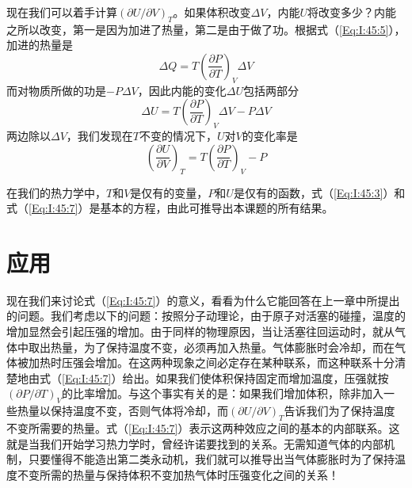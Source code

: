 现在我们可以着手计算$(\partial U /\partial V)_T$。如果体积改变$\Delta V$，内能$U$将改变多少？内能之所以改变，第一是因为加进了热量，第二是由于做了功。根据式（\ref{Eq:I:45:5}），加进的热量是
\begin{equation*}
    \Delta Q = T\left(\frac{\partial P}{\partial T}\right)_V \Delta V
\end{equation*}
而对物质所做的功是$-P \Delta V$，因此内能的变化$\Delta U$包括两部分
\begin{equation}
    \label{Eq:I:45:6}
    \Delta U = T\left(\frac{\partial P}{\partial T}\right)_V \Delta V - P\Delta V
\end{equation}
两边除以$\Delta V$，我们发现在$T$不变的情况下，$U$对$V$的变化率是
\begin{equation}
    \label{Eq:I:45:7}
    \left(\frac{\partial U}{\partial V}\right)_T = T \left(\frac{\partial P}{\partial T}\right)_V - P
\end{equation}

在我们的热力学中，$T$和$V$是仅有的变量，$P$和$U$是仅有的函数，式（\ref{Eq:I:45:3}）和式（\ref{Eq:I:45:7}）是基本的方程，由此可推导出本课题的所有结果。

\section{应用}

现在我们来讨论式（\ref{Eq:I:45:7}）的意义，看看为什么它能回答在上一章中所提出的问题。我们考虑以下的问题：按照分子动理论，由于原子对活塞的碰撞，温度的增加显然会引起压强的增加。由于同样的物理原因，当让活塞往回运动时，就从气体中取出热量，为了保持温度不变，必须再加入热量。气体膨胀时会冷却，而在气体被加热时压强会增加。在这两种现象之间必定存在某种联系，而这种联系十分清楚地由式（\ref{Eq:I:45:7}）给出。如果我们使体积保持固定而增加温度，压强就按$(\partial P /\partial T)_V$的比率增加。与这个事实有关的是：如果我们增加体积，除非加入一些热量以保持温度不变，否则气体将冷却，而$(\partial U /\partial V)_T$告诉我们为了保持温度不变所需要的热量。式（\ref{Eq:I:45:7}）表示这两种效应之间的基本的内部联系。这就是当我们开始学习热力学时，曾经许诺要找到的关系。无需知道气体的内部机制，只要懂得不能造出第二类永动机，我们就可以推导出当气体膨胀时为了保持温度不变所需的热量与保持体积不变加热气体时压强变化之间的关系！

